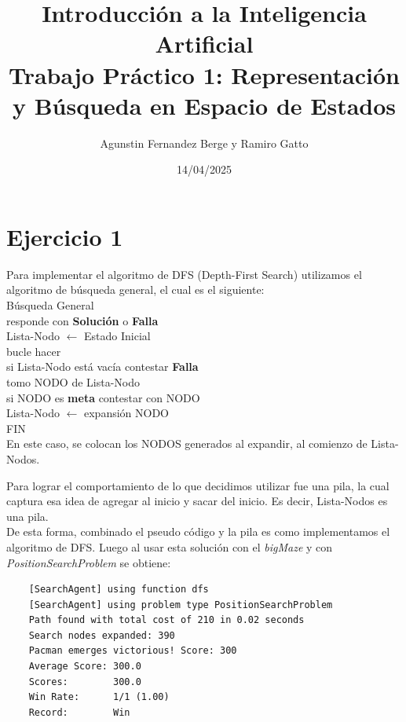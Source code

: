 \documentclass[12pt, titlepage, a4paper]{article}
\title{Introducción a la Inteligencia Artificial \\
Trabajo Práctico 1: Representación y Búsqueda en Espacio de Estados }
\author{Agunstin Fernandez Berge y Ramiro Gatto}
\date{14/04/2025}
\begin{document}
\maketitle

\section{Ejercicio 1}
Para implementar el algoritmo de DFS (Depth-First Search) utilizamos 
el algoritmo de búsqueda general, el cual es el siguiente:\\ 

\noindent Búsqueda General\\
\indent responde con \textbf{Solución} o \textbf{Falla}\\
\indent Lista-Nodo $\leftarrow$ Estado Inicial\\

\noindent bucle hacer\\
\indent si Lista-Nodo está vacía contestar \textbf{Falla}\\
\indent tomo NODO de Lista-Nodo\\
\indent si NODO es \textbf{meta} contestar con NODO\\
\indent Lista-Nodo $\leftarrow$ expansión NODO\\
\noindent FIN\\

En este caso, se colocan los NODOS generados al expandir, al comienzo de Lista-Nodos. 

Para lograr el comportamiento de  lo que  
decidimos utilizar fue una pila, la cual captura esa idea de agregar al inicio y sacar del inicio. 
Es decir, Lista-Nodos es una pila.\\

De esta forma, combinado el pseudo código y la pila es como implementamos 
el algoritmo de DFS. Luego al usar esta solución con el \textit{bigMaze} 
y con \textit{PositionSearchProblem} se obtiene:
\begin{verbatim}
    [SearchAgent] using function dfs
    [SearchAgent] using problem type PositionSearchProblem
    Path found with total cost of 210 in 0.02 seconds
    Search nodes expanded: 390
    Pacman emerges victorious! Score: 300
    Average Score: 300.0
    Scores:        300.0
    Win Rate:      1/1 (1.00)
    Record:        Win
\end{verbatim}

\end{document}

